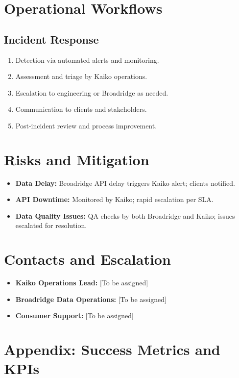 \documentclass[12pt,a4paper]{article}
\begin{document}
\section{Operational Workflows}

\subsection*{Incident Response}
\begin{enumerate}
    \item Detection via automated alerts and monitoring.
    \item Assessment and triage by Kaiko operations.
    \item Escalation to engineering or Broadridge as needed.
    \item Communication to clients and stakeholders.
    \item Post-incident review and process improvement.
\end{enumerate}

\section{Risks and Mitigation}

\begin{itemize}[leftmargin=*]
    \item \textbf{Data Delay:} Broadridge API delay triggers Kaiko alert; clients notified.
    \item \textbf{API Downtime:} Monitored by Kaiko; rapid escalation per SLA.
    \item \textbf{Data Quality Issues:} QA checks by both Broadridge and Kaiko; issues escalated for resolution.
\end{itemize}

\section{Contacts and Escalation}

\begin{itemize}[leftmargin=*]
    \item \textbf{Kaiko Operations Lead:} [To be assigned]
    \item \textbf{Broadridge Data Operations:} [To be assigned]
    \item \textbf{Consumer Support:} [To be assigned]
\end{itemize}

\section{Appendix: Success Metrics and KPIs}
\end{document}
